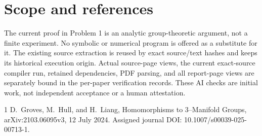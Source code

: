 \documentclass[10pt]{article}
\begin{document}
\section*{Scope and references}
The current proof in Problem 1 is an analytic group-theoretic argument, not a finite experiment. No symbolic or numerical program is offered as a substitute for it. The existing source extraction is reused by exact source/text hashes and keeps its historical execution origin. Actual source-page views, the current exact-source compiler run, retained dependencies, PDF parsing, and all report-page views are separately bound in the per-paper verification records. These AI checks are initial work, not independent acceptance or a human attestation.\par
1 D. Groves, M. Hull, and H. Liang, Homomorphisms to 3–Manifold Groups, arXiv:2103.06095v3, 12 July 2024. Assigned journal DOI: 10.1007/s00039-025-00713-1.\par
\end{document}
